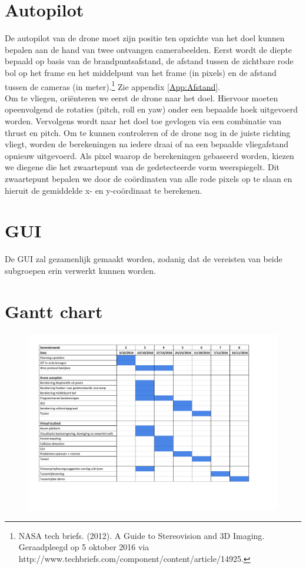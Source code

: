 \documentclass{peno-opdracht1}
\begin{document}
\section{Autopilot}
De autopilot van de drone moet zijn positie ten opzichte van het doel kunnen bepalen aan de hand van twee ontvangen camerabeelden. Eerst wordt de diepte bepaald op basis van de brandpuntsafstand, de afstand tussen de zichtbare rode bol op het frame en het middelpunt van het frame (in pixels) en de afstand tussen de camera\textquotesingle s (in meter).\footnote{NASA tech briefs. (2012). A Guide to Stereovision and 3D Imaging. Geraadpleegd op 5 oktober 2016 via http://www.techbriefs.com/component/content/article/14925.\label{refnote}} Zie appendix \ref{App:Afstand}. \\
Om te vliegen, ori\"enteren we eerst de drone naar het doel. Hiervoor moeten opeenvolgend de rotaties (pitch, roll en yaw) onder een bepaalde hoek uitgevoerd worden. Vervolgens wordt naar het doel toe gevlogen via een combinatie van thrust en pitch.
Om te kunnen controleren of de drone nog in de juiste richting vliegt, worden de berekeningen na iedere draai of na een bepaalde vliegafstand opnieuw uitgevoerd.
Als pixel waarop de berekeningen gebaseerd worden, kiezen we diegene die het zwaartepunt van de gedetecteerde vorm weerspiegelt. Dit zwaartepunt bepalen we door de co\"ordinaten van alle rode pixels op te slaan en hieruit de gemiddelde x- en y-co\"ordinaat te berekenen.

\section{GUI}
De GUI zal gezamenlijk gemaakt worden, zodanig dat de vereisten van beide subgroepen erin verwerkt kunnen worden. \\

\newpage
\appendix
\section{Gantt chart} \label{App:Planning}

\begin{figure}[h!]
	\begin{center}
		\includegraphics[scale=0.55]{Planning.pdf}
	\end{center}
\end{figure}
\end{document}
